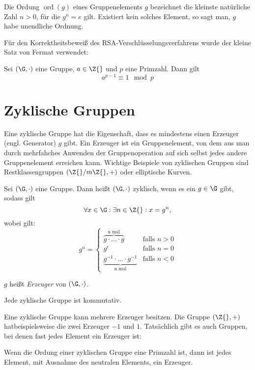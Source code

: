 \begin{definition}
  Die Ordung $\operatorname{ord}(g) $ eines Gruppenelements $g$
  bezeichnet die kleinste 
  natürliche Zahl $n>0$, für die $g^n = e$ gilt. Existiert kein solches
  Element, so sagt man, $g$ habe unendliche Ordnung.
 \end{definition}

Für den Korrektheitsbeweiß des RSA-Verschlüsselungsverfahrens wurde der
kleine Satz von Fermat verwendet: 
 \begin{theorem}
   Sei $(\G, \cdot)$ eine Gruppe, $a \in \Z{}$ und $p$ eine
   Primzahl. Dann gilt
   \[a^{p-1} \equiv 1 \mod p\]
 \end{theorem}
\section{Zyklische Gruppen}
Eine zyklische Gruppe hat die Eigenschaft, dass es mindestens einen
Erzeuger (engl. Generator) $g$
gibt. Ein Erzeuger ist ein Gruppenelement, von dem aus man durch
mehrfahches Anwenden der Gruppenoperation auf sich selbst
jedes andere Gruppenelement erreichen kann. Wichtige Beispiele von
zyklischen Gruppen sind Restklassengruppen $(\Z{}/m\Z{}, +)$ oder
elliptische Kurven.

\begin{definition}
  Sei $(\G, \cdot)$ eine Gruppe. Dann heißt $(\G, \cdot)$ zyklisch, wenn
  es ein $g \in \G$ gibt, sodass gilt
  \[
    \forall x \in \G: \exists n \in \Z{}: x=g^n,
  \]
  wobei gilt:
\[
 g^n = 
  \begin{cases} 
   \overbrace{g \cdot \dotsc \cdot g}^{\text{n mal}} & \text{falls } n > 0 \\
   g^e       & \text{falls } n = 0 \\
   \underbrace{g^{-1} \cdot \dotsc \cdot g^{-1}}_{\text{n mal}} &
   \text{falls }n < 0
  \end{cases}
\]

$g$ heißt \textit{Erzeuger} von $(\G, \cdot)$. 
\end{definition}

\begin{theorem}
Jede zyklische Gruppe ist kommutativ.  
\end{theorem}

Eine zyklische Gruppe kann mehrere Erzeuger besitzen. Die Gruppe $(\Z{},
+)$ hatbeispielsweise die zwei Erzeuger $-1$ und $1$. Tatsächlich gibt es auch
Gruppen, bei denen fast jedes Element ein Erzeuger ist: 
\begin{theorem} 
Wenn die Ordung einer zyklischen Gruppe eine Primzahl ist, dann ist
jedes Element, mit Ausnahme des neutralen Elements, ein Erzeuger. 
\end{theorem}


